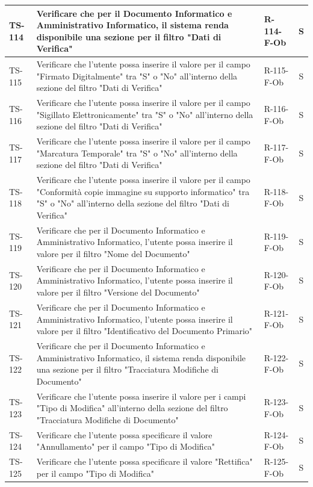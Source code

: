 \documentclass[a4paper,12pt]{article}
\begin{document}
\begin{longtable}{|p{1.5cm}|p{8.3cm}|p{2.4cm}|c|}
\hline
TS-114 & Verificare che per il Documento Informatico e Amministrativo Informatico, il sistema renda disponibile una sezione per il filtro "Dati di Verifica" & R-114-F-Ob & S \\
\hline
TS-115 & Verificare che l'utente possa inserire il valore per il campo "Firmato Digitalmente" tra "S" o "No" all'interno della sezione del filtro "Dati di Verifica" & R-115-F-Ob & S \\
\hline
TS-116 & Verificare che l'utente possa inserire il valore per il campo "Sigillato Elettronicamente" tra "S" o "No" all'interno della sezione del filtro "Dati di Verifica" & R-116-F-Ob & S \\
\hline
TS-117 & Verificare che l'utente possa inserire il valore per il campo "Marcatura Temporale" tra "S" o "No" all'interno della sezione del filtro "Dati di Verifica" & R-117-F-Ob & S \\
\hline
TS-118 & Verificare che l'utente possa inserire il valore per il campo "Conformità copie immagine su supporto informatico" tra "S" o "No" all'interno della sezione del filtro "Dati di Verifica" & R-118-F-Ob & S \\
\hline
TS-119 & Verificare che per il Documento Informatico e Amministrativo Informatico, l'utente possa inserire il valore per il filtro "Nome del Documento" & R-119-F-Ob & S \\
\hline
TS-120 & Verificare che per il Documento Informatico e Amministrativo Informatico, l'utente possa inserire il valore per il filtro "Versione del Documento" & R-120-F-Ob & S \\
\hline
TS-121 & Verificare che per il Documento Informatico e Amministrativo Informatico, l'utente possa inserire il valore per il filtro "Identificativo del Documento Primario" & R-121-F-Ob & S \\
\hline
TS-122 & Verificare che per il Documento Informatico e Amministrativo Informatico, il sistema renda disponibile una sezione per il filtro "Tracciatura Modifiche di Documento" & R-122-F-Ob & S \\
\hline
TS-123 & Verificare che l'utente possa inserire il valore per i campi "Tipo di Modifica" all'interno della sezione del filtro "Tracciatura Modifiche di Documento" & R-123-F-Ob & S \\
\hline
TS-124 & Verificare che l'utente possa specificare il valore "Annullamento" per il campo "Tipo di Modifica" & R-124-F-Ob & S \\
\hline
TS-125 & Verificare che l'utente possa specificare il valore "Rettifica" per il campo "Tipo di Modifica" & R-125-F-Ob & S \\

\end{longtable}
\end{document}
